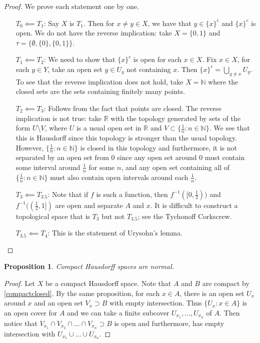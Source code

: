 \documentclass[11pt]{amsart}
\newtheorem{proposition}[theorem]{Proposition}
\theoremstyle{definition}
\numberwithin{equation}{section}
\begin{document}
\begin{proof}
    We prove each statement one by one.
    \begin{enumerate}
        \item [$T_0\impliedby T_1$:] Say $X$ is $T_1$. Then for $x\ne y\in X$, we have that $y\in \{x\}^c$ and $\{x\}^c$ is open. We do not have the reverse implication: take $X=\{0,1\}$ and $\tau=\{\emptyset,\{0\},\{0,1\}\}$.
        \item [$T_1\impliedby T_2$:] We need to show that $\{x\}^c$ is open for each $x\in X$. Fix $x\in X$, for each $y\in Y$, take an open set $y\in U_y$ not containing $x$. Then $\{x\}^c=\bigcup_{y\ne x}U_y$. To see that the reverse implication does not hold, take $X=\mathbb N$ where the closed sets are the sets containing finitely many points.
        \item [$T_2\impliedby T_3$:] Follows from the fact that points are closed. The reverse implication is not true: take $\mathbb R$ with the topology generated by sets of the form $U\setminus V$, where $U$ is a usual open set in $\mathbb R$ and $V\subset\{\frac{1}{n}:n\in\mathbb N\}$. We see that this is Hausdorff since this topology is stronger than the usual topology. However, $\{\frac{1}{n}:n\in\mathbb N\}$ is closed in this topology and furthermore, it is not separated by an open set from $0$ since any open set around $0$ must contain some interval around $\frac{1}{n}$ for some $n$, and any open set containing all of $\{\frac{1}{n}:n\in\mathbb N\}$ must also contain open intervals around each $\frac{1}{n}$.
        \item [$T_3\impliedby T_{3.5}$:] Note that if $f$ is such a function, then $f^{-1}([0,\frac{1}{2}))$ and $f^{-1}((\frac{1}{2},1])$ are open and separate $A$ and $x$. It is difficult to construct a topological space that is $T_3$ but not $T_{3.5}$; see the Tychonoff Corkscrew.
        \item [$T_{3.5}\impliedby T_4$:] This is the statement of Urysohn's lemma.
    \end{enumerate}
\end{proof}
\begin{proposition}
    Compact Hausdorff spaces are normal.
\end{proposition}
\begin{proof}
    Let $X$ be a compact Hausdorff space. Note that $A$ and $B$ are compact by \ref{compactclosed}. By the same proposition, for each $x\in A$, there is an open set $U_x$ around $x$ and an open set $V_x\supset B$ with empty intersection. Thus $\{U_x:x\in A\}$ is an open cover for $A$ and we can take a finite subcover $U_{x_1},\ldots,U_{x_n}$ of $A$. Then notice that $V_{x_1}\cap V_{x_2}\cap\ldots\cap V_{x_n}\supset B$ is open and furthermore, has empty intersection with $U_{x_1}\cup \ldots\cup U_{x_n}$.
\end{proof}
\end{document}
